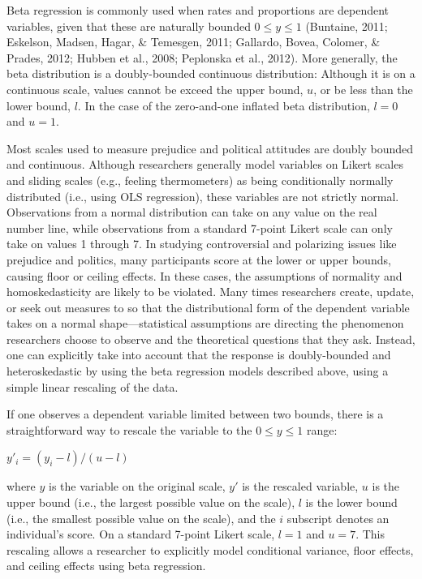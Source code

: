 \documentclass[english,man]{apa6}
\theoremstyle{definition}
\theoremstyle{definition}
\theoremstyle{remark}
\begin{document}
Beta regression is commonly used when rates and proportions are
dependent variables, given that these are naturally bounded
\(0 \leq y \leq 1\) (Buntaine, 2011; Eskelson, Madsen, Hagar, \&
Temesgen, 2011; Gallardo, Bovea, Colomer, \& Prades, 2012; Hubben et
al., 2008; Peplonska et al., 2012). More generally, the beta
distribution is a doubly-bounded continuous distribution: Although it is
on a continuous scale, values cannot be exceed the upper bound, \(u\),
or be less than the lower bound, \(l\). In the case of the zero-and-one
inflated beta distribution, \(l = 0\) and \(u = 1\).

Most scales used to measure prejudice and political attitudes are doubly
bounded and continuous. Although researchers generally model variables
on Likert scales and sliding scales (e.g., feeling thermometers) as
being conditionally normally distributed (i.e., using OLS regression),
these variables are not strictly normal. Observations from a normal
distribution can take on any value on the real number line, while
observations from a standard 7-point Likert scale can only take on
values 1 through 7. In studying controversial and polarizing issues like
prejudice and politics, many participants score at the lower or upper
bounds, causing floor or ceiling effects. In these cases, the
assumptions of normality and homoskedasticity are likely to be violated.
Many times researchers create, update, or seek out measures to so that
the distributional form of the dependent variable takes on a normal
shape---statistical assumptions are directing the phenomenon researchers
choose to observe and the theoretical questions that they ask. Instead,
one can explicitly take into account that the response is doubly-bounded
and heteroskedastic by using the beta regression models described above,
using a simple linear rescaling of the data.

If one observes a dependent variable limited between two bounds, there
is a straightforward way to rescale the variable to the
\(0 \leq y \leq 1\) range:

\begin{center}
$y'_i = (y_i - l) / (u - l)$
\end{center}

where \(y\) is the variable on the original scale, \(y'\) is the
rescaled variable, \(u\) is the upper bound (i.e., the largest possible
value on the scale), \(l\) is the lower bound (i.e., the smallest
possible value on the scale), and the \(i\) subscript denotes an
individual's score. On a standard 7-point Likert scale, \(l = 1\) and
\(u = 7\). This rescaling allows a researcher to explicitly model
conditional variance, floor effects, and ceiling effects using beta
regression.
\end{document}
